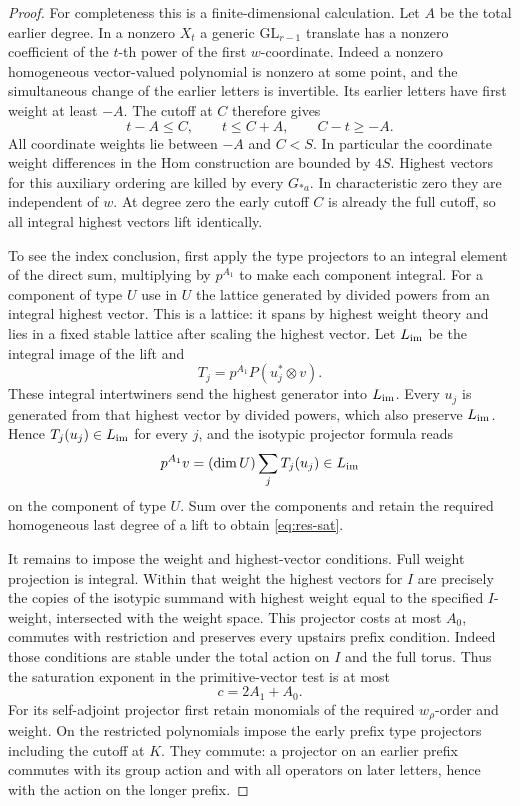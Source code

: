 \begin{proof}
For completeness this is a finite-dimensional calculation. Let
\(A\) be the total earlier degree. In a nonzero \(X_t\) a generic
\(\mathrm{GL}_{r-1}\) translate has a nonzero coefficient of the
\(t\)-th power of the first \(w\)-coordinate. Indeed a nonzero
homogeneous vector-valued polynomial is nonzero at some point,
and the simultaneous change of the earlier letters is invertible.
Its earlier letters have first weight at least \(-A\). The cutoff at \(C\) therefore gives
\[
 t-A\le C,\qquad t\le C+A,\qquad C-t\ge -A.
\]
All coordinate weights lie between \(-A\) and \(C<S\). In particular the coordinate weight differences
in the Hom construction are bounded by \(4S\). Highest vectors
for this auxiliary ordering are killed by every \(G_{*a}\).
In characteristic zero they are independent of \(w\). At degree
zero the early cutoff \(C\) is already the full cutoff, so all
integral highest vectors lift identically.

To see the index conclusion, first apply the type projectors to
an integral element of the direct sum, multiplying by \(p^{A_1}\)
to make each component integral. For a component of type \(U\)
use in \(U\) the lattice generated by divided powers from an
integral highest vector. This is a lattice: it spans by highest
weight theory and lies in a fixed stable lattice after scaling
the highest vector. Let \(L_{\rm im}\) be the integral image of the lift
and
\[
 T_j=p^{A_1}P(u_j^*\otimes v).
\]
These integral
intertwiners send the highest generator into \(L_{\rm im}\).
Every \(u_j\) is generated from that highest vector by
divided powers, which also preserve \(L_{\rm im}\).
Hence \(T_j(u_j)\in L_{\rm im}\) for every \(j\), and
the isotypic projector formula reads
\[
       p^{A_1}v=(\dim U)\sum_j T_j(u_j)\in L_{\rm im}
\]
on the component of type \(U\). Sum over the components and retain the required
homogeneous last degree of a lift to obtain \eqref{eq:res-sat}.

It remains to impose the weight and highest-vector conditions.
Full weight projection is integral. Within that weight the
highest vectors for \(I\) are precisely the copies of the
isotypic summand with highest weight equal to the specified
\(I\)-weight, intersected with the weight space. This projector
costs at most \(A_0\), commutes with restriction and preserves
every upstairs prefix condition. Indeed those conditions are
stable under the total action on \(I\) and the full torus.
Thus the saturation exponent in the primitive-vector test is
at most
\[
 c=2A_1+A_0.
\]
For its self-adjoint projector first
retain monomials of the required \(w_\rho\)-order and weight.
On the restricted polynomials impose the early prefix type
projectors including the cutoff at \(K\). They commute: a
projector on an earlier prefix commutes with its group action
and with all operators on later letters, hence with the action
on the longer prefix.


\end{proof}
